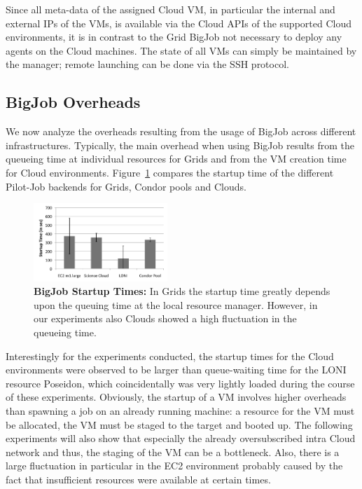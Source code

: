\documentclass[conference,final]{IEEEtran}
\newcommand{\up}{\vspace*{-1em}}
\newcommand{\alnote}[1]{ {\textcolor{blue} { ***AL: #1 }}}
\newcommand{\jhanote}[1]{ {\textcolor{red} { ***SJ: #1 }}}
\newcommand{\alnote}[1]{}
\newcommand{\jhanote}[1]{}
\begin{document}
Since all meta-data of the assigned Cloud VM, in particular the
internal and external IPs of the VMs, is available via the Cloud APIs
of the supported Cloud environments, it is in contrast to the Grid
BigJob not necessary to deploy any agents on the Cloud machines. The
state of all VMs can simply be maintained by the manager; remote
launching can be done via the SSH protocol.

\subsection{BigJob Overheads} 
\up


We now analyze the overheads resulting from the usage of BigJob across
different infrastructures. Typically, the main overhead when using
BigJob results from the queueing time at individual resources for
Grids and from the VM creation time for Cloud environments.
Figure~\ref{fig:performance_setup_time} compares the startup time of
the different Pilot-Job backends for Grids, Condor pools and Clouds.
\begin{figure}[htbp]
    \centering
        \includegraphics[width=0.45\textwidth]{performance/setup_time_xls.pdf}
    \caption{\textbf{BigJob Startup Times:} In Grids the startup time
      greatly depends upon the queuing time at the local resource
      manager. However, in our experiments also Clouds showed a high
      fluctuation in the queueing time.}
    \label{fig:performance_setup_time}
\end{figure}

Interestingly for the experiments conducted, the startup times for the
Cloud environments were observed to be larger than queue-waiting time
for the LONI resource Poseidon, which coincidentally was very lightly
loaded during the course of these experiments. Obviously, the startup
of a VM involves higher overheads than spawning a job on an already
running machine: a resource for the VM must be allocated, the VM must
be staged to the target and booted up. The following experiments will
also show that especially the already oversubscribed intra Cloud
network and thus, the staging of the VM can be a bottleneck. Also,
there is a large fluctuation in particular in the EC2 environment
probably caused by the fact that insufficient resources were available
at certain times.
\end{document}
